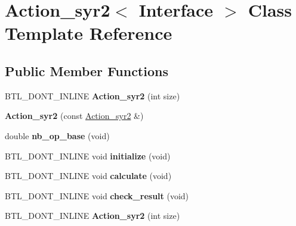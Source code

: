 \hypertarget{class_action__syr2}{}\section{Action\+\_\+syr2$<$ Interface $>$ Class Template Reference}
\label{class_action__syr2}
\subsection*{Public Member Functions}
\begin{DoxyCompactItemize}
\item 
\mbox{\label{class_action__syr2_a35f3140e50e1e8e5e5f7288a9064dfe9}} 
B\+T\+L\+\_\+\+D\+O\+N\+T\+\_\+\+I\+N\+L\+I\+NE {\bfseries Action\+\_\+syr2} (int size)
\item 
\mbox{\label{class_action__syr2_a6b0f6b7aaafa63b24a38af2206e24ae6}} 
{\bfseries Action\+\_\+syr2} (const \hyperlink{class_action__syr2}{Action\+\_\+syr2} \&)
\item 
\mbox{\label{class_action__syr2_a1cb3df321cd156d78617a51612b4c1d8}} 
double {\bfseries nb\+\_\+op\+\_\+base} (void)
\item 
\mbox{\label{class_action__syr2_ac2d981057caebb2d851e8015cbc92b33}} 
B\+T\+L\+\_\+\+D\+O\+N\+T\+\_\+\+I\+N\+L\+I\+NE void {\bfseries initialize} (void)
\item 
\mbox{\label{class_action__syr2_a2eaf718241551433942ab7d781e7e23e}} 
B\+T\+L\+\_\+\+D\+O\+N\+T\+\_\+\+I\+N\+L\+I\+NE void {\bfseries calculate} (void)
\item 
\mbox{\label{class_action__syr2_a8957cb1c84dcaf06fb54e28cd366ade0}} 
B\+T\+L\+\_\+\+D\+O\+N\+T\+\_\+\+I\+N\+L\+I\+NE void {\bfseries check\+\_\+result} (void)
\item 
\mbox{\label{class_action__syr2_a35f3140e50e1e8e5e5f7288a9064dfe9}} 
B\+T\+L\+\_\+\+D\+O\+N\+T\+\_\+\+I\+N\+L\+I\+NE {\bfseries Action\+\_\+syr2} (int size)
\item 
\mbox{\label{class_action__syr2_a6b0f6b7aaafa63b24a38af2206e24ae6}} 

\end{DoxyCompactItemize}
